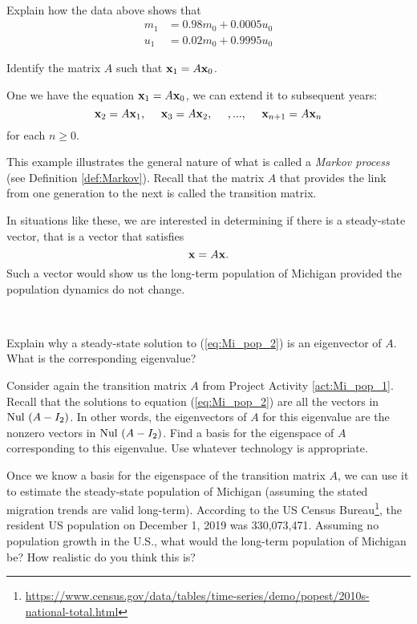 \begin{pactivity} \label{act:Mi_pop_1} ~
\ba
\item Explain how the data above shows that 
\begin{align*}
m_1 &= 0.98m_0 + 0.0005u_0 \\
u_1 &= 0.02m_0 + 0.9995u_0
\end{align*}


\item Identify the matrix $A$ such that $\mathbf{x}_1 = A \mathbf{x}_{0}$. 


\ea

\end{pactivity}

One we have the equation $\mathbf{x}_1 = A\mathbf{x}_0$, we can extend it to subsequent years:
\[\vx_2 = A\vx_1, \ \ \ \ \vx_3 = A \vx_2, \ \ \ \ , ..., \ \ \ \ \vx_{n+1} = A \vx_n\]
for each $n \geq 0$.

This example illustrates the general nature of what is called a \emph{Markov process} (see Definition \ref{def:Markov}). Recall that the matrix $A$ that provides the link from one generation to the next is called the transition matrix.

In situations like these, we are interested in determining if there is a steady-state vector, that is a vector that satisfies 
\begin{equation} \label{eq:Mi_pop_2}
\mathbf{x} = A \mathbf{x}.
\end{equation}
Such a vector would show us the long-term population of Michigan provided the population dynamics do not change.

\begin{pactivity}  ~
\ba
\item Explain why a steady-state solution to (\ref{eq:Mi_pop_2}) is an eigenvector of $A$. What is the corresponding eigenvalue? 


\item Consider again the transition matrix $A$ from Project Activity \ref{act:Mi_pop_1}. Recall that the solutions to equation (\ref{eq:Mi_pop_2}) are all the vectors in $\text{Nul } (A-I_2)$. In other words, the eigenvectors of $A$ for this eigenvalue are the nonzero vectors in $\text{Nul } (A-I_2)$. Find a basis for the eigenspace of $A$ corresponding to this eigenvalue. Use whatever technology is appropriate. 

\item Once we know a basis for the eigenspace of the transition matrix $A$, we can use it to estimate the steady-state population of Michigan (assuming the stated migration trends are valid long-term). According to the US Census Bureau\footnote{\url{https://www.census.gov/data/tables/time-series/demo/popest/2010s-national-total.html}}, the resident US population on December 1, 2019 was 330,073,471. Assuming no population growth in the U.S., what would the long-term population of Michigan be? How realistic do you think this is? 

 
\ea

\end{pactivity}

